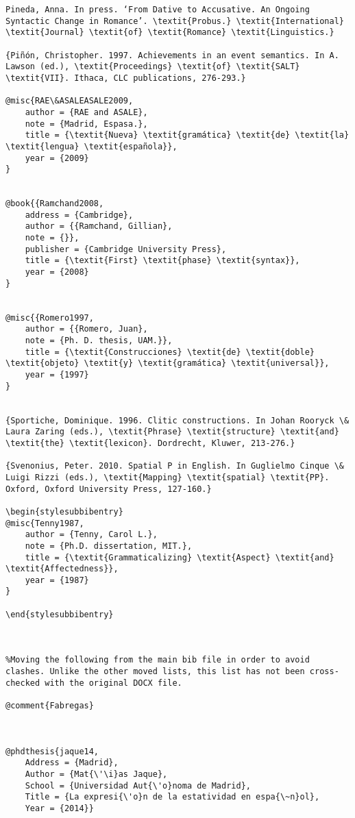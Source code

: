 \documentclass[output=paper,modfonts,nonflat]{langsci/langscibook}
\begin{document}
\begin{verbatim}
Pineda, Anna. In press. ‘From Dative to Accusative. An Ongoing Syntactic Change in Romance’. \textit{Probus.} \textit{International} \textit{Journal} \textit{of} \textit{Romance} \textit{Linguistics.}

{Piñón, Christopher. 1997. Achievements in an event semantics. In A. Lawson (ed.), \textit{Proceedings} \textit{of} \textit{SALT} \textit{VII}. Ithaca, CLC publications, 276-293.}

@misc{RAE\&ASALEASALE2009,
	author = {RAE and ASALE},
	note = {Madrid, Espasa.},
	title = {\textit{Nueva} \textit{gramática} \textit{de} \textit{la} \textit{lengua} \textit{española}},
	year = {2009}
}


@book{{Ramchand2008,
	address = {Cambridge},
	author = {{Ramchand, Gillian},
	note = {}},
	publisher = {Cambridge University Press},
	title = {\textit{First} \textit{phase} \textit{syntax}},
	year = {2008}
}


@misc{{Romero1997,
	author = {{Romero, Juan},
	note = {Ph. D. thesis, UAM.}},
	title = {\textit{Construcciones} \textit{de} \textit{doble} \textit{objeto} \textit{y} \textit{gramática} \textit{universal}},
	year = {1997}
}


{Sportiche, Dominique. 1996. Clitic constructions. In Johan Rooryck \& Laura Zaring (eds.), \textit{Phrase} \textit{structure} \textit{and} \textit{the} \textit{lexicon}. Dordrecht, Kluwer, 213-276.}

{Svenonius, Peter. 2010. Spatial P in English. In Guglielmo Cinque \& Luigi Rizzi (eds.), \textit{Mapping} \textit{spatial} \textit{PP}. Oxford, Oxford University Press, 127-160.}

\begin{stylesubbibentry}
@misc{Tenny1987,
	author = {Tenny, Carol L.},
	note = {Ph.D. dissertation, MIT.},
	title = {\textit{Grammaticalizing} \textit{Aspect} \textit{and} \textit{Affectedness}},
	year = {1987}
}

\end{stylesubbibentry}



%Moving the following from the main bib file in order to avoid clashes. Unlike the other moved lists, this list has not been cross-checked with the original DOCX file.

@comment{Fabregas}
 


@phdthesis{jaque14,
	Address = {Madrid},
	Author = {Mat{\'\i}as Jaque},
	School = {Universidad Aut{\'o}noma de Madrid},
	Title = {La expresi{\'o}n de la estatividad en espa{\~n}ol},
	Year = {2014}}


\end{verbatim}
\end{document}
